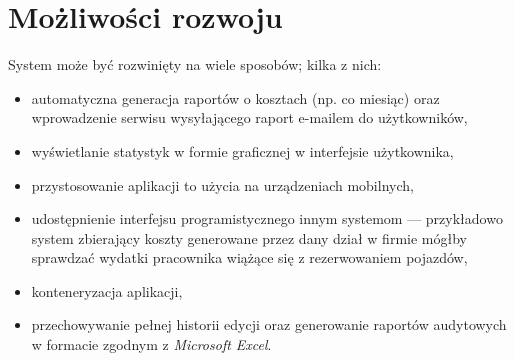 \documentclass[eng,printmode,openany]{mgr}
\begin{document}
	\section{Możliwości rozwoju}
	System może być rozwinięty na wiele sposobów; kilka z nich:
	\begin{itemize}
		\item automatyczna generacja raportów o kosztach (np. co miesiąc) oraz wprowadzenie serwisu wysyłającego raport e-mailem do użytkowników,
		\item wyświetlanie statystyk w formie graficznej w interfejsie użytkownika,
		\item przystosowanie aplikacji to użycia na urządzeniach mobilnych,
		\item udostępnienie interfejsu programistycznego innym systemom — przykładowo system zbierający koszty generowane przez dany dział w firmie mógłby sprawdzać wydatki pracownika wiążące się z rezerwowaniem pojazdów,
		\item konteneryzacja aplikacji,
		\item przechowywanie pełnej historii edycji oraz generowanie raportów audytowych w formacie zgodnym z \textit{Microsoft Excel}.
	\end{itemize}
	
	
	
	
\end{document}
